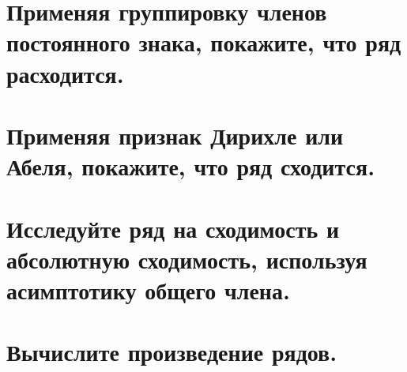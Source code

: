 \documentclass[a4paper,fleqn]{article}
\begin{document}
	
	\section*{Применяя группировку членов постоянного знака, покажите, что ряд расходится.}
	
	
	
	
	
	\section*{Применяя признак Дирихле или Абеля, покажите, что ряд сходится.}
	
	
	
	
	
	
	\section*{Исследуйте ряд на сходимость и абсолютную сходимость, используя асимптотику общего члена.}
	
	
	
	
	
	
	\section*{Вычислите произведение рядов.}
	
	
\end{document}
